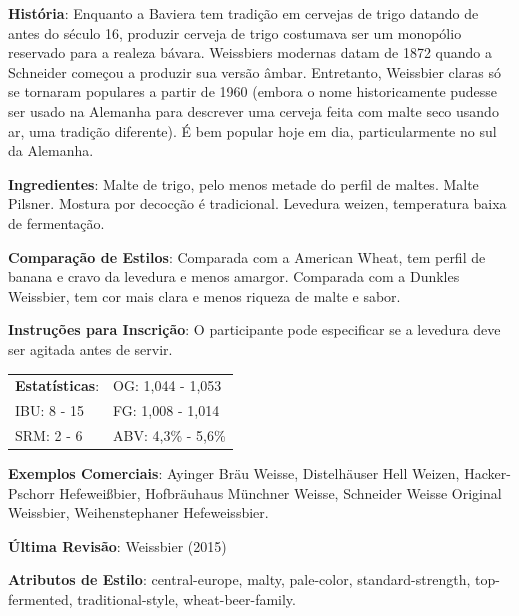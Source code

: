 \textbf{História}: Enquanto a Baviera tem tradição em cervejas de trigo datando de antes do século 16, produzir cerveja de trigo costumava ser um monopólio reservado para a realeza bávara. Weissbiers modernas datam de 1872 quando a Schneider começou a produzir sua versão âmbar. Entretanto, Weissbier claras só se tornaram populares a partir de 1960 (embora o nome historicamente pudesse ser usado na Alemanha para descrever uma cerveja feita com malte seco usando ar, uma tradição diferente). É bem popular hoje em dia, particularmente no sul da Alemanha.

\textbf{Ingredientes}: Malte de trigo, pelo menos metade do perfil de maltes. Malte Pilsner. Mostura por decocção é tradicional. Levedura weizen, temperatura baixa de fermentação.

\textbf{Comparação de Estilos}: Comparada com a American Wheat, tem perfil de banana e cravo da levedura e menos amargor. Comparada com a Dunkles Weissbier, tem cor mais clara e menos riqueza de malte e sabor.

\textbf{Instruções para Inscrição}: O participante pode especificar se a levedura deve ser agitada antes de servir.

\begin{tabular}{@{}p{35mm}p{35mm}@{}}
  \textbf{Estatísticas}: & OG: 1,044 - 1,053 \\
  IBU: 8 - 15 & FG: 1,008 - 1,014 \\
  SRM: 2 - 6 & ABV: 4,3\% - 5,6\%
\end{tabular}

\textbf{Exemplos Comerciais}: Ayinger Bräu Weisse, Distelhäuser Hell Weizen, Hacker-Pschorr Hefeweißbier, Hofbräuhaus Münchner Weisse, Schneider Weisse Original Weissbier, Weihenstephaner Hefeweissbier.

\textbf{Última Revisão}: Weissbier (2015)

\textbf{Atributos de Estilo}: central-europe, malty, pale-color, standard-strength, top-fermented, traditional-style, wheat-beer-family.
